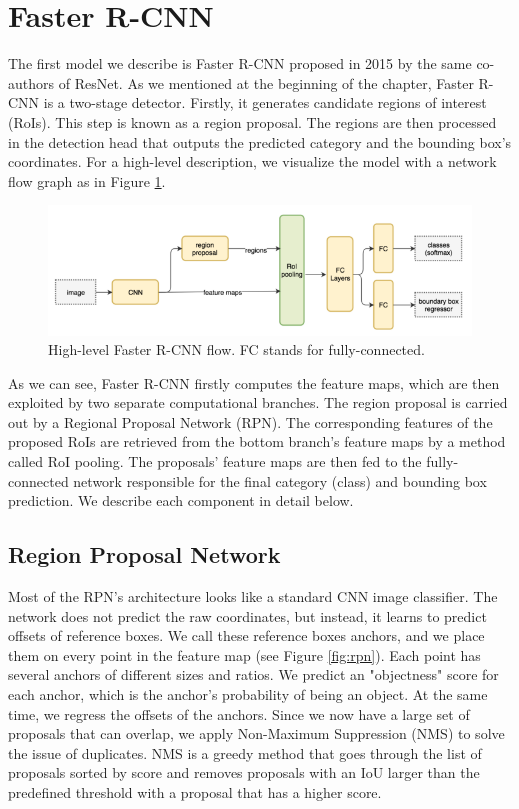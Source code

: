 \section{Faster R-CNN}
The first model we describe is Faster R-CNN proposed in 2015 by the same co-authors of ResNet. As we mentioned at the beginning of the chapter, Faster R-CNN is a two-stage detector. Firstly, it generates candidate regions of interest (RoIs). This step is known as a region proposal. The regions are then processed in the detection head that outputs the predicted category and the bounding box's coordinates.  For a high-level description, we visualize the model with a network flow graph as in Figure \ref{fig:fasterrcnn}. 

\begin{figure}[h]
    \centering
    \includegraphics[width=\linewidth]{Sources/Figures/fasterrcnn.png}
    \caption{High-level Faster R-CNN flow. FC stands for fully-connected. }
    \label{fig:fasterrcnn}
\end{figure}

As we can see, Faster R-CNN firstly computes the feature maps, which are then exploited by two separate computational branches. The region proposal is carried out by a Regional Proposal Network (RPN). The corresponding features of the proposed RoIs are retrieved from the bottom branch's feature maps by a method called RoI pooling. The proposals' feature maps are then fed to the fully-connected network responsible for the final category (class) and bounding box prediction. We describe each component in detail below.

\subsection{Region Proposal Network}
Most of the RPN's architecture looks like a standard CNN image classifier. The network does not predict the raw coordinates, but instead, it learns to predict offsets of reference boxes. We call these reference boxes anchors, and we place them on every point in the feature map (see Figure \ref{fig:rpn}). Each point has several anchors of different sizes and ratios. We predict an "objectness" score for each anchor, which is the anchor's probability of being an object. At the same time, we regress the offsets of the anchors. Since we now have a large set of proposals that can overlap, we apply Non-Maximum Suppression (NMS) to solve the issue of duplicates. NMS is a greedy method that goes through the list of proposals sorted by score and removes proposals with an IoU larger than the predefined threshold with a proposal that has a higher score.

